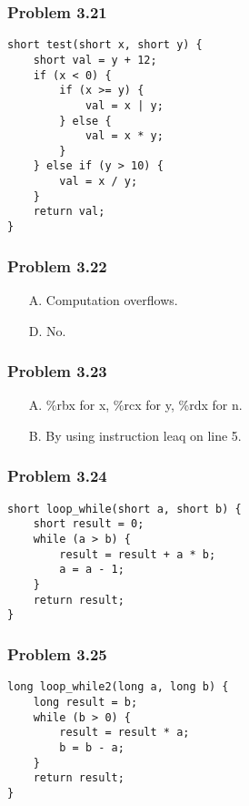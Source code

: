 \documentclass[a4paper]{article}
\begin{document}
\subsubsection*{Problem 3.21}
\begin{lstlisting}
short test(short x, short y) {
    short val = y + 12;
    if (x < 0) {
        if (x >= y) {
            val = x | y;
        } else {
            val = x * y;
        }
    } else if (y > 10) {
        val = x / y;
    }
    return val;
}
\end{lstlisting}

\subsubsection*{Problem 3.22}
\begin{enumerate}
    \item [A.] Computation overflows.
    \item [D.] No.
\end{enumerate}

\subsubsection*{Problem 3.23}
\begin{enumerate}
    \item [A.] \%rbx for x, \%rcx for y, \%rdx for n.
    \item [B.] By using instruction leaq on line 5.
\end{enumerate}

\subsubsection*{Problem 3.24}
\begin{lstlisting}
short loop_while(short a, short b) {
    short result = 0;
    while (a > b) {
        result = result + a * b;
        a = a - 1;
    }
    return result;
}
\end{lstlisting}

\subsubsection*{Problem 3.25}
\begin{lstlisting}
long loop_while2(long a, long b) {
    long result = b;
    while (b > 0) {
        result = result * a;
        b = b - a;
    }
    return result;
}
\end{lstlisting}
\end{document}
